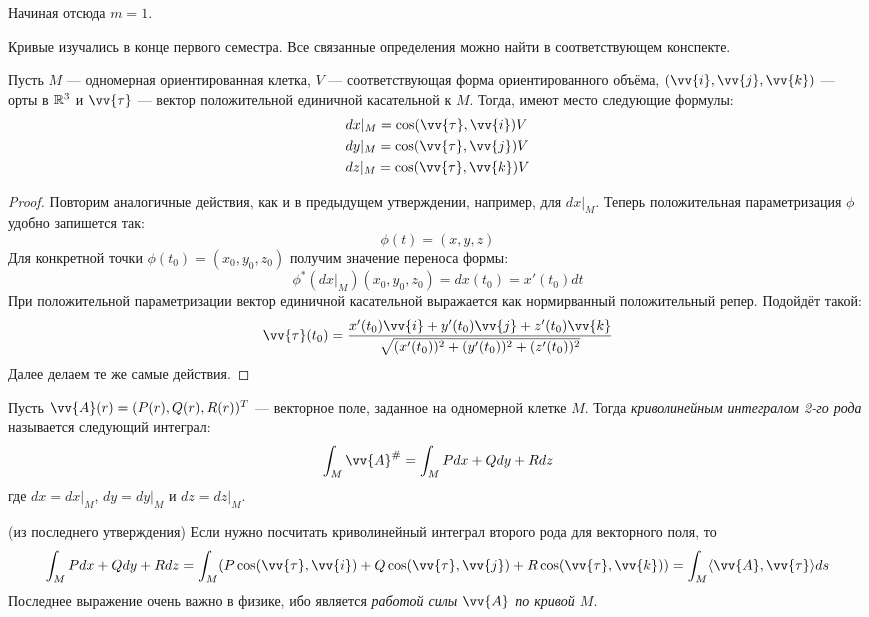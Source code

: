 \begin{note}
	Начиная отсюда $m = 1$.
\end{note}

\begin{reminder}
	Кривые изучались в конце первого семестра. Все связанные определения можно найти в соответствующем конспекте.
\end{reminder}

\begin{proposition}
	Пусть $M$ --- одномерная ориентированная клетка, $V$ --- соответствующая форма ориентированного объёма, $(\vv{i}, \vv{j}, \vv{k})$ --- орты в $\mathbb{R}^3$ и $\vv{\tau}$ --- вектор положительной единичной касательной к $M$. Тогда, имеют место следующие формулы:
	\begin{align*}
		&{dx|_M = \cos(\vv{\tau}, \vv{i})V}
		\\
		&{dy|_M = \cos(\vv{\tau}, \vv{j})V}
		\\
		&{dz|_M = \cos(\vv{\tau}, \vv{k})V}
	\end{align*}
\end{proposition}

\begin{proof}
	Повторим аналогичные действия, как и в предыдущем утверждении, например, для $dx|_M$. Теперь положительная параметризация $\phi$ удобно запишется так:
	\[
		\phi(t) = (x, y, z)
	\]
	Для конкретной точки $\phi(t_0) = (x_0, y_0, z_0)$ получим значение переноса формы:
	\[
		\phi^*(dx|_M)(x_0, y_0, z_0) = dx(t_0) = x'(t_0)dt
	\]
	При положительной параметризации вектор единичной касательной выражается как нормирванный положительный репер. Подойдёт такой:
	\[
		\vv{\tau}(t_0) = \frac{x'(t_0)\vv{i} + y'(t_0)\vv{j} + z'(t_0)\vv{k}}{\sqrt{(x'(t_0))^2 + (y'(t_0))^2 + (z'(t_0))^2}}
	\]
	Далее делаем те же самые действия.
\end{proof}

\begin{definition}
	Пусть $\vv{A}(r) = (P(r), Q(r), R(r))^T$ --- векторное поле, заданное на одномерной клетке $M$. Тогда \textit{криволинейным интегралом 2-го рода} называется следующий интеграл:
	\[
		\int_M \vv{A}^\# = \int_M Pdx + Qdy + Rdz
	\]
	где $dx = dx|_M$, $dy = dy|_M$ и $dz = dz|_M$.
\end{definition}

\begin{corollary} (из последнего утверждения)
	Если нужно посчитать криволинейный интеграл второго рода для векторного поля, то
	\[
		\int_M Pdx + Qdy + Rdz = \int_M (P\cos(\vv{\tau}, \vv{i}) + Q\cos(\vv{\tau}, \vv{j}) + R\cos(\vv{\tau}, \vv{k})) = \int_M \ntbr{\vv{A}, \vv{\tau}}ds
	\]
	Последнее выражение очень важно в физике, ибо является \textit{работой силы $\vv{A}$ по кривой $M$}.
\end{corollary}

